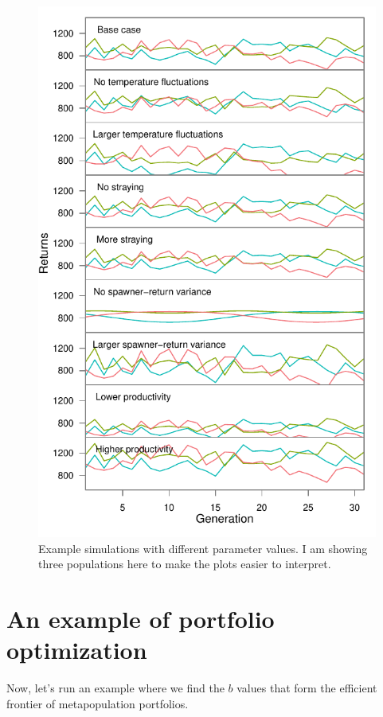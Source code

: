 \documentclass[12pt]{article}
\begin{document}
\begin{figure}[htbp]
\centering
\includegraphics{figure/plot-various-options-ts-3pops.pdf}
\caption{Example simulations with different parameter values. I am
showing three populations here to make the plots easier to
interpret.\label{fig:sim-param-ts-3}}
\end{figure}

\clearpage

\section{An example of portfolio optimization}

Now, let's run an example where we find the $b$ values that form the
efficient frontier of metapopulation portfolios.
\end{document}
